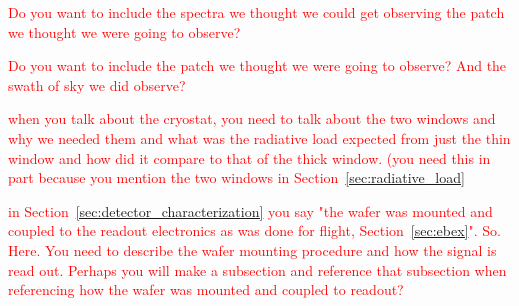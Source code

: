  \textcolor{red}{Do you want to include the spectra we thought we could get observing the patch we thought we were going to observe?}
 
 \textcolor{red}{Do you want to include the patch we thought we were going to observe? And the swath of sky we did observe?}


\textcolor{red}{when you talk about the cryostat, you need to talk about the two windows and why we needed them and what was the radiative load expected from just the thin window and how did it compare to that of the thick window. (you need this in part because you mention the two windows in Section~\ref{sec:radiative_load}}

\textcolor{red}{in Section~\ref{sec:detector_characterization} you say "the wafer was mounted and coupled to the readout electronics as was done for flight, Section~\ref{sec:ebex}". 
So. 
Here. You need to describe the wafer mounting procedure and how the signal is read out. 
Perhaps you will make a subsection and reference that subsection when referencing how the wafer was mounted and coupled to readout?}

 








